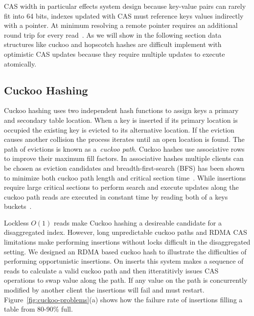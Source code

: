 CAS width in particular effects system design because
key-value pairs can rarely fit into 64 bits, indexes updated
with CAS must reference keys values indirectly with a
pointer. At minimum resolving a remote pointer requires an
additional round trip for every read~\cite{race,clover}.
As we will show in the following section data structures
like cuckoo and hopscotch hashes are difficult implement with
optimistic CAS updates because they require multiple updates
to execute atomically.


\subsection{Cuckoo Hashing} 
\label{sec:cuckoo-back}
Cuckoo hashing uses two independent hash functions to assign
keys a primary and secondary table location. When a key is
inserted if its primary location is occupied the existing
key is evicted to its alternative location. If the eviction
causes another collision the process iterates until an open
location is found. The path of evictions is known as
a~\textit{cuckoo path}. Cuckoo hashes use associative rows
to improve their maximum fill factors. In associative hashes
multiple clients can be chosen as eviction candidates and
breadth-first-search (BFS) has been shown to minimize both
cuckoo path length and critical section time~\cite{memc3,
cuckoo-improvements}.  While insertions require large
critical sections to perform search and execute updates
along the cuckoo path reads are executed in constant time by
reading both of a keys buckets~\cite{pilaf}.


Lockless $O(1)$ reads make Cuckoo hashing a desireable
candidate for a disaggregated index. However, long
unpredictable cuckoo paths and RDMA CAS limitations make
performing insertions without locks difficult in the
disaggregated setting. We designed an RDMA based cuckoo hash
to illustrate the difficulties of performing opportunistic
insertions. On inserts this system makes a sequence of reads
to calculate a valid cuckoo path and then itteratitivly
issues CAS operations to swap value along the path. If any
value on the path is concurrently modified by another client
the insertions will fail and must restart.
Figure~\ref{fig:cuckoo-problems}(a) shows how the failure
rate of insertions filling a table from 80-90\% full.


